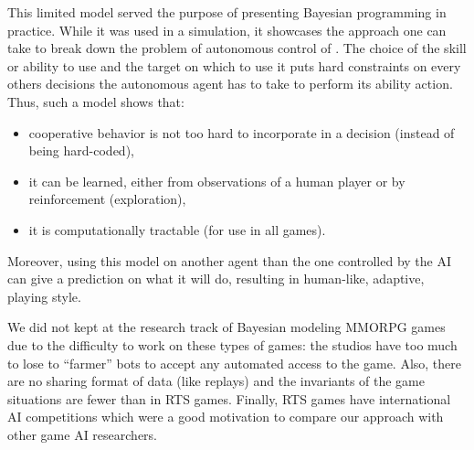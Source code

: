 This limited model served the purpose of presenting Bayesian programming in practice. While it was used in a simulation, it showcases the approach one can take to break down the problem of autonomous control of . The choice of the skill or ability to use and the target on which to use it puts hard constraints on every others decisions the autonomous agent has to take to perform its ability action. Thus, such a model shows that:
\begin{itemize}
    \item cooperative behavior is not too hard to incorporate in a decision (instead of being hard-coded),
    \item it can be learned, either from observations of a human player or by reinforcement (exploration),
    \item it is computationally tractable (for use in all games).%
\end{itemize}
Moreover, using this model on another agent than the one controlled by the AI can give a prediction on what it will do, resulting in human-like, adaptive, playing style.

We did not kept at the research track of Bayesian modeling MMORPG games due to the difficulty to work on these types of games: the studios have too much to lose to ``farmer'' bots to accept any automated access to the game. Also, there are no sharing format of data (like replays) and the invariants of the game situations are fewer than in RTS games. Finally, RTS games have international AI competitions which were a good motivation to compare our approach with other game AI researchers.
